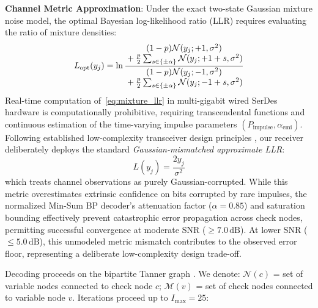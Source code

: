 \documentclass[conference]{IEEEtran}
\begin{document}
\textbf{Channel Metric Approximation}: Under the exact two-state Gaussian mixture noise model, the optimal Bayesian log-likelihood ratio (LLR) requires evaluating the ratio of mixture densities:
\begin{equation}
    L_{\text{opt}}(y_j) = \ln \frac{%
    \begin{array}{@{}c@{}}
        (1 - p)\mathcal{N}(y_j; +1, \sigma^2) \\
        {}+ \frac{p}{2}\sum_{s \in \{\pm \alpha\}} \mathcal{N}(y_j; +1 + s, \sigma^2)
    \end{array}}{%
    \begin{array}{@{}c@{}}
        (1 - p)\mathcal{N}(y_j; -1, \sigma^2) \\
        {}+ \frac{p}{2}\sum_{s \in \{\pm \alpha\}} \mathcal{N}(y_j; -1 + s, \sigma^2)
    \end{array}}
    \label{eq:mixture_llr}
\end{equation}
Real-time computation of~\eqref{eq:mixture_llr} in multi-gigabit wired SerDes hardware is computationally prohibitive, requiring transcendental functions and continuous estimation of the time-varying impulse parameters $(P_{\text{impulse}}, \alpha_{\text{emi}})$. Following established low-complexity transceiver design principles \cite{chen2005,fossorier1999}, our receiver deliberately deploys the standard \textit{Gaussian-mismatched approximate LLR}:
\begin{equation}
    L(y_j) = \frac{2 y_j}{\sigma^2}
    \label{eq:llr}
\end{equation}
which treats channel observations as purely Gaussian-corrupted. While this metric overestimates extrinsic confidence on bits corrupted by rare impulses, the normalized Min-Sum BP decoder's attenuation factor ($\alpha = 0.85$) and saturation bounding effectively prevent catastrophic error propagation across check nodes, permitting successful convergence at moderate SNR ($\ge 7.0\,\text{dB}$). At lower SNR ($\le 5.0\,\text{dB}$), this unmodeled metric mismatch contributes to the observed error floor, representing a deliberate low-complexity design trade-off.

Decoding proceeds on the bipartite Tanner graph \cite{tanner1981}. We denote: $\mathcal{N}(c)$ = set of variable nodes connected to check node $c$; $\mathcal{M}(v)$ = set of check nodes connected to variable node $v$. Iterations proceed up to $I_{\max} = 25$:
\end{document}
